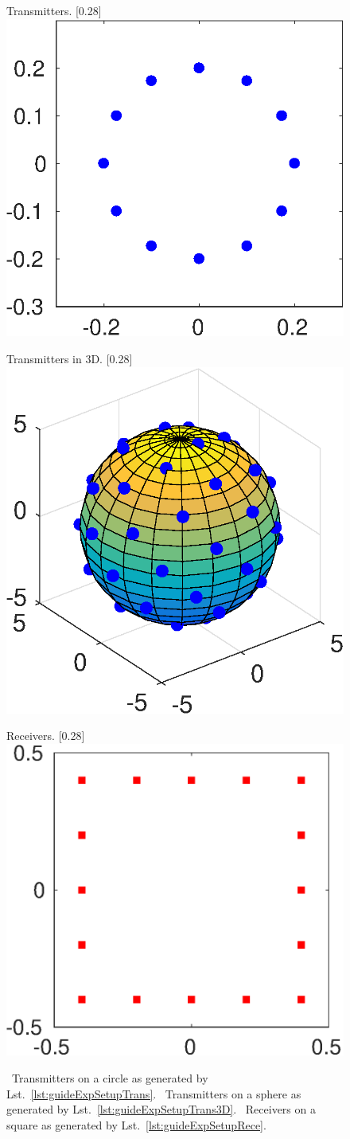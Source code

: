 \documentclass[a4paper]{article}
\begin{document}
\begin{figure}
\centering
\begin{subcaptionbox}{Transmitters.
   \label{fig:guide:expSetupTrans}}[0.28\textwidth]{
   \includegraphics[height=0.24\textwidth]{figs/fig_guideExpSetupTrans}
  }
\end{subcaptionbox}
\begin{subcaptionbox}{Transmitters in 3D.
   \label{fig:guide:expSetupTrans3D}}[0.28\textwidth]{
   \includegraphics[height=0.24\textwidth]{figs/fig_guideExpSetupTrans3D}
  }
\end{subcaptionbox}
\begin{subcaptionbox}{Receivers.
   \label{fig:guide:expSetupRece}}[0.28\textwidth]{
   \includegraphics[height=0.24\textwidth]{figs/fig_guideExpSetupRece}
  }
\end{subcaptionbox}
\caption{~Transmitters on a circle as generated by Lst.~\ref{lst:guideExpSetupTrans}. 
~Transmitters on a sphere as generated by Lst.~\ref{lst:guideExpSetupTrans3D}. 
~Receivers on a square as generated by Lst.~\ref{lst:guideExpSetupRece}.}
\label{fig:guide:expSetupTransAndRecei}
\end{figure}
\end{document}
